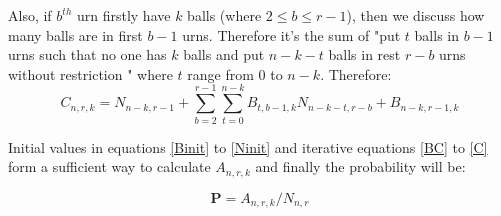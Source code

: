 \documentclass[12pt]{article}
\begin{document}
Also, if $b^{th}$ urn firstly have $k$ balls (where $2 \le b \le r-1$), then we discuss how many balls are in first $b-1$ urns. Therefore it's the sum of "put $t$ balls in $b-1$ urns such that no one has $k$ balls and put $n-k-t$ balls in rest $r-b$ urns without restriction " where $t$ range from $0$ to $n-k$. Therefore:
\begin{equation} \label{C} 
C_{n,r,k} = N_{n-k,r-1} + \sum^{r-1}_{b=2} \sum_{t=0}^{n-k} B_{t,b-1,k} N_{n-k-t,r-b} + B_{n-k,r-1,k}
\end{equation}

Initial values in equations \ref{Binit} to \ref{Ninit} and iterative equations \ref{BC} to \ref{C} form a sufficient way to calculate $A_{n,r,k}$ and finally the probability will be:

$$\textbf{P} = A_{n,r,k} / N_{n,r}$$
\end{document}
